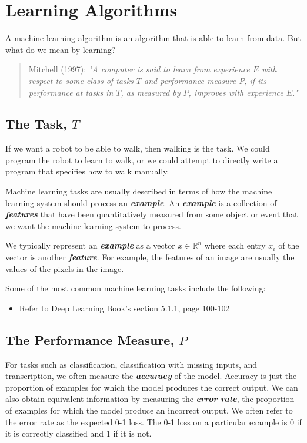 \documentclass{report}
\begin{document}
\section{Learning Algorithms}
A machine learning algorithm is an algorithm that is able to learn from data. But what do we mean by learning?

\begin{quotation}
\noindent Mitchell (1997): \textit{"A computer is said to learn from experience $E$ with respect to some class of tasks $T$ and performance measure $P$, if its performance at tasks in $T$, as measured by $P$, improves with experience $E$."}
\end{quotation}

\subsection{The Task, $T$}
\noindent If we want a robot to be able to walk, then walking is the task. We could program the robot to learn to walk, or we could attempt to directly write a program that specifies how to walk manually.\newline

\noindent Machine learning tasks are usually described in terms of how the machine learning system should process an \textit{\textbf{example}}. An \textbf{\textit{example}} is a collection of \textbf{\textit{features}} that have been quantitatively measured from some object or event that we want the machine learning system to process. 

\noindent We typically represent an \textbf{\textit{example}} as a vector $x \in \mathbb{R}^n$ where each entry $x_i$ of the vector is another \textbf{\textit{feature}}. For example, the features of an image are usually the values of the pixels in the image.\newline

\noindent Some of the most common machine learning tasks include the following:\newline
\begin{itemize}
	\item Refer to Deep Learning Book's section 5.1.1, page 100-102
\end{itemize}

\subsection{The Performance Measure, $P$}
\noindent For tasks such as classification, classification with missing inputs, and transcription, we often measure the \textbf{\textit{accuracy}} of the model. Accuracy is just the proportion of examples for which the model produces the correct output. We can also obtain equivalent information by measuring the \textbf{\textit{error rate}}, the proportion of examples for which the model produce an incorrect output. We often refer to the error rate as the expected 0-1 loss. The 0-1 loss on a particular example is 0 if it is correctly classified and 1 if it is not. \newline
\end{document}

